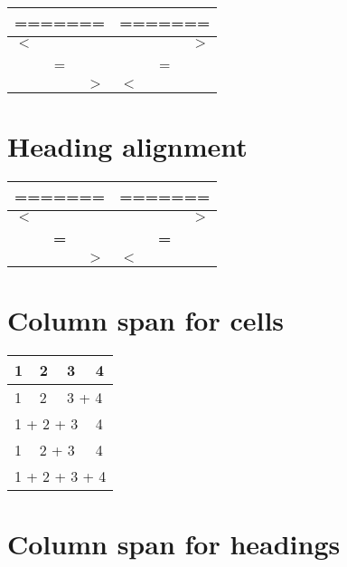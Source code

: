 \documentclass{article}
\begin{document}
\begin{center}\begin{tabular}{|l|l|}
\hline ======= & ======= \\
\hline $<$ & \multicolumn{1}{|r|}{$>$} \\
\hline \multicolumn{1}{|c|}{=} & \multicolumn{1}{|c|}{=} \\
\hline \multicolumn{1}{|r|}{$>$} & $<$ \\
\hline \end{tabular}\end{center}

\section*{Heading alignment}

\begin{center}\begin{tabular}{|l|l|}
\hline \textbf{=======} & \textbf{=======} \\
\hline \textbf{$<$} & \multicolumn{1}{|r|}{\textbf{$>$}} \\
\hline \multicolumn{1}{|c|}{\textbf{=}} & \multicolumn{1}{|c|}{\textbf{=}} \\
\hline \multicolumn{1}{|r|}{\textbf{$>$}} & \textbf{$<$} \\
\hline \end{tabular}\end{center}

\section*{Column span for cells}

\begin{center}\begin{tabular}{|l|l|l|l|}
\hline 1 & 2 & 3 & 4 \\
\hline 1 & 2 & \multicolumn{2}{|l|}{3 + 4} \\
\hline \multicolumn{3}{|l|}{1 + 2 + 3} & 4 \\
\hline 1 & \multicolumn{2}{|l|}{2 + 3} & 4 \\
\hline \multicolumn{4}{|l|}{1 + 2 + 3 + 4} \\
\hline \end{tabular}\end{center}

\section*{Column span for headings}
\end{document}
